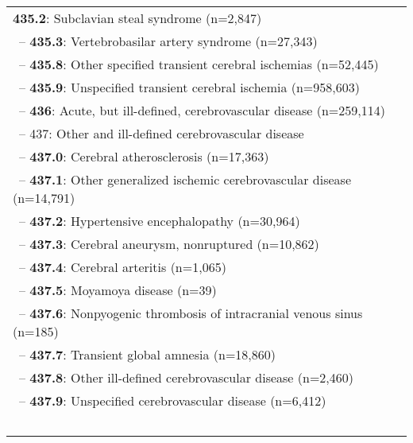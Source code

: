 \begin{longtable}{p{\textwidth}}
{\color{ForestGreen} \textbf{435.2}}: Subclavian steal syndrome (n=2,847)} \\ \-\ \hspace{30pt}\footnotesize{-- {\color{ForestGreen} \textbf{435.3}}: Vertebrobasilar artery syndrome (n=27,343)} \\ \-\ \hspace{30pt}\footnotesize{-- {\color{ForestGreen} \textbf{435.8}}: Other specified transient cerebral ischemias (n=52,445)} \\ \-\ \hspace{30pt}\footnotesize{-- {\color{ForestGreen} \textbf{435.9}}: Unspecified transient cerebral ischemia (n=958,603)} \\ \-\ \hspace{20pt}\footnotesize{-- {\color{ForestGreen} \textbf{436}}: Acute, but ill-defined, cerebrovascular disease (n=259,114)} \\ \-\ \hspace{20pt}\footnotesize{-- 437: Other and ill-defined cerebrovascular disease} \\ \-\ \hspace{30pt}\footnotesize{-- {\color{ForestGreen} \textbf{437.0}}: Cerebral atherosclerosis (n=17,363)} \\ \-\ \hspace{30pt}\footnotesize{-- {\color{ForestGreen} \textbf{437.1}}: Other generalized ischemic cerebrovascular disease (n=14,791)} \\ \-\ \hspace{30pt}\footnotesize{-- {\color{ForestGreen} \textbf{437.2}}: Hypertensive encephalopathy (n=30,964)} \\ \-\ \hspace{30pt}\footnotesize{-- {\color{ForestGreen} \textbf{437.3}}: Cerebral aneurysm, nonruptured (n=10,862)} \\ \-\ \hspace{30pt}\footnotesize{-- {\color{ForestGreen} \textbf{437.4}}: Cerebral arteritis (n=1,065)} \\ \-\ \hspace{30pt}\footnotesize{-- {\color{ForestGreen} \textbf{437.5}}: Moyamoya disease (n=39)} \\ \-\ \hspace{30pt}\footnotesize{-- {\color{ForestGreen} \textbf{437.6}}: Nonpyogenic thrombosis of intracranial venous sinus (n=185)} \\ \-\ \hspace{30pt}\footnotesize{-- {\color{ForestGreen} \textbf{437.7}}: Transient global amnesia (n=18,860)} \\ \-\ \hspace{30pt}\footnotesize{-- {\color{ForestGreen} \textbf{437.8}}: Other ill-defined cerebrovascular disease (n=2,460)} \\ \-\ \hspace{30pt}\footnotesize{-- {\color{ForestGreen} \textbf{437.9}}: Unspecified cerebrovascular disease (n=6,412)} \\ \-\ \hspace{20pt}\footnotesize{-- 438: Late effects of cerebrovascular 
\end{longtable}

